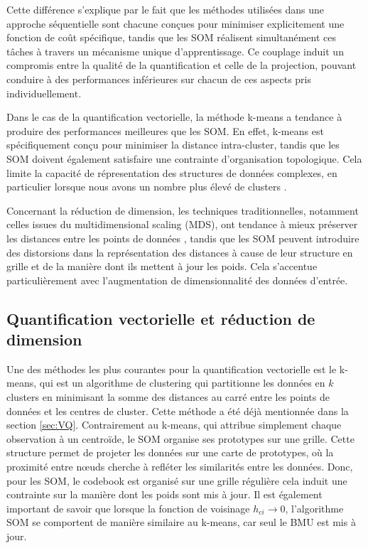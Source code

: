 \documentclass[12pt,a4paper]{report}
\begin{document}
Cette différence s'explique par le fait que les méthodes utilisées dans une approche séquentielle sont chacune conçues pour minimiser explicitement une fonction de coût spécifique, 
tandis que les SOM réalisent simultanément ces tâches à travers un mécanisme unique d'apprentissage. Ce couplage induit un compromis entre la qualité de la quantification et celle de la projection, 
pouvant conduire à des performances inférieures sur chacun de ces aspects pris individuellement.

Dans le cas de la quantification vectorielle, la méthode k-means a tendance à produire des performances meilleures que les SOM. En effet, k-means est spécifiquement conçu pour minimiser la distance intra-cluster, 
tandis que les SOM doivent également satisfaire une contrainte d'organisation topologique. Cela limite la capacité de répresentation des structures de données complexes, 
en particulier lorsque nous avons un nombre plus élevé de clusters \cite{Limitations_SOM}.

Concernant la réduction de dimension, les techniques traditionnelles, notamment celles issues du multidimensional scaling (MDS), ont tendance à mieux préserver les distances entre les points de données \cite{BorgGroenen2005}, tandis que les SOM peuvent introduire des distorsions dans la représentation 
des distances à cause de leur structure en grille et de la manière dont ils mettent à jour les poids. Cela s'accentue particulièrement avec l'augmentation de dimensionnalité des données d'entrée.

\subsection{Quantification vectorielle et réduction de dimension}

Une des méthodes les plus courantes pour la quantification vectorielle est le k-means, qui est un algorithme de clustering qui partitionne les données en $k$ clusters en minimisant 
la somme des distances au carré entre les points de données et les centres de cluster. Cette méthode a été déjà mentionnée dans la section \ref{sec:VQ}. 
Contrairement au k-means, qui attribue simplement chaque observation à un centroïde, le SOM organise ses prototypes sur une grille. 
Cette structure permet de projeter les données sur une carte de prototypes, où la proximité entre nœuds cherche à refléter les similarités entre les données.
Donc, pour les SOM, le codebook est organisé sur une grille régulière cela induit une contrainte sur la manière dont les poids sont mis à jour. 
Il est également important de savoir que lorsque la fonction de voisinage $h_{ci} \rightarrow 0$, l'algorithme SOM se comportent de manière similaire au k-means, car seul le BMU est mis à jour\cite{Kohonen2012SOM}. 
\end{document}
